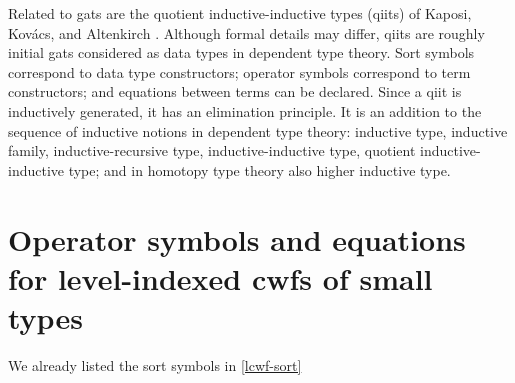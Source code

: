\documentclass[11pt,a4paper]{article}
\theoremstyle{plain}
\theoremstyle{definition}
\def\lp{\mathrm{lp}}
\newcommand{\tuple}[1]{\langle #1 \rangle}
\def\p{\mathrm{p}}
\def\q{\mathrm{q}}
\begin{document}
Related to gats are the quotient inductive-inductive types (qiits) of Kaposi, Kov{\'{a}}cs, and Altenkirch
\cite{kaposi:qiits,kovacs:phd}. Although formal details may differ, qiits are roughly initial gats considered as data types in dependent type theory. Sort symbols correspond to data type constructors; operator symbols correspond to term constructors; and equations between terms can be declared. Since a qiit is inductively generated, it has an elimination principle. It is an addition to the sequence of inductive notions in dependent type theory: inductive type, inductive family, inductive-recursive type, inductive-inductive type, quotient inductive-inductive type; and in homotopy type theory also higher inductive type.




\appendix
\section{Operator symbols and equations for level-indexed cwfs of small types}

We already listed the sort symbols in \ref{lcwf-sort}
\end{document}
